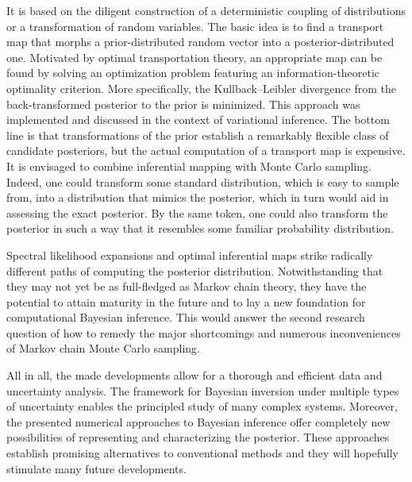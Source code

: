 It is based on the diligent construction of a deterministic coupling of distributions or a transformation of random variables.
The basic idea is to find a transport map that morphs a prior-distributed random vector into a posterior-distributed one.
Motivated by optimal transportation theory, an appropriate map can be found by solving an optimization problem featuring an information-theoretic optimality criterion.
More specifically, the Kullback--Leibler divergence from the back-transformed posterior to the prior is minimized.
This approach was implemented and discussed in the context of variational inference.
The bottom line is that transformations of the prior establish a remarkably flexible class of candidate posteriors, but the actual computation of a transport map is expensive.
It is envisaged to combine inferential mapping with Monte Carlo sampling.
Indeed, one could transform some standard distribution, which is easy to sample from, into a distribution that mimics the posterior, which in turn would aid in assessing the exact posterior.
By the same token, one could also transform the posterior in such a way that it resembles some familiar probability distribution.
\par %
Spectral likelihood expansions and optimal inferential maps strike radically different paths of computing the posterior distribution.
Notwithstanding that they may not yet be as full-fledged as Markov chain theory,
they have the potential to attain maturity in the future and to lay a new foundation for computational Bayesian inference.
This would answer the second research question of how to remedy the major shortcomings and numerous inconveniences of Markov chain Monte Carlo sampling.

\vspace{3.5ex}											%
All in all, the made developments allow for a thorough and efficient data and uncertainty analysis.
The framework for Bayesian inversion under multiple types of uncertainty enables the principled study of many complex systems.
Moreover, the presented numerical approaches to Bayesian inference offer completely new possibilities of representing and characterizing the posterior.
These approaches establish promising alternatives to conventional methods and they will hopefully stimulate many future developments.